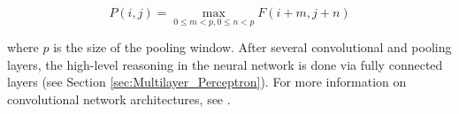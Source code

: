 \begin{equation}
P(i, j) = \max_{0 \leq m < p, 0 \leq n < p} F(i+m, j+n)
\end{equation}

where \( p \) is the size of the pooling window. After several convolutional and pooling layers, the high-level reasoning in the neural network is done via fully connected layers (see Section \ref{sec:Multilayer_Perceptron}). For more information on convolutional network architectures, see \cite{oshea2015}.
